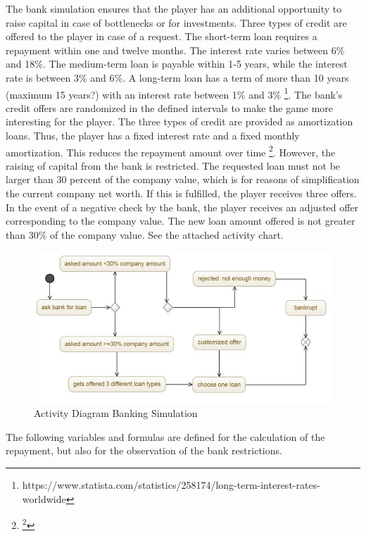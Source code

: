 The bank simulation ensures that the player has an additional opportunity to raise capital in case of bottlenecks or for investments. Three types of credit are offered to the player in case of a request. 
The short-term loan requires a repayment within one and twelve months. The interest rate varies between 6\% and 18\%. The medium-term loan is payable within 1-5 years, while the interest rate is between 3\% and 6\%. A long-term loan has a term of more than 10 years (maximum 15 years?) with an interest rate between 1\% and 3\% \footnote{https://www.statista.com/statistics/258174/long-term-interest-rates-worldwide}. The bank's credit offers are randomized in the defined intervals to make the game more interesting for the player. The three types of credit are provided as amortization loans. Thus, the player has a fixed interest rate and a fixed monthly amortization. This reduces the repayment amount over time \footnote{\footnote{https://www.investopedia.com/terms/a/amortized\_loan.asp}}.
However, the raising of capital from the bank is restricted.
The requested loan must not be larger than 30 percent of the company value, which is for reasons of simplification the current company net worth. If this is fulfilled, the player receives three offers. In the event of a negative check by the bank, the player receives an adjusted offer corresponding to the company value. The new loan amount offered is not greater than 30\% of the company value. See the attached activity chart. 

\begin{figure}
	\centering
	\includegraphics[width=12cm]{images/banking_activity_diagram.jpg}
	\caption{Activity Diagram Banking Simulation}
	\label{jpg:banking}
\end{figure}

The following variables and formulas are defined for the calculation of the repayment, but also for the observation of the bank restrictions.\\


